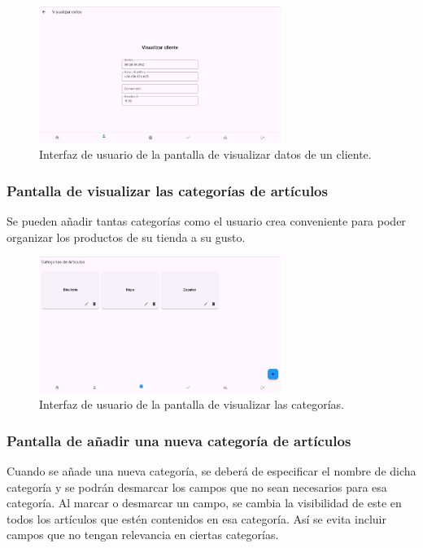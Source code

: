 \begin{figure}[H]
	\centering
	\includegraphics[width=0.7\textwidth]{imagenes/PrimeraIteracion/detallesCliente.png}
	\caption{Interfaz de usuario de la pantalla de visualizar datos de un cliente.}
	\label{fig:appDetallesCliente}
\end{figure}

\subsubsection{Pantalla de visualizar las categorías de artículos}

Se pueden añadir tantas categorías como el usuario crea conveniente para poder organizar los productos de su tienda a su gusto. 

\begin{figure}[H]
	\centering
	\includegraphics[width=0.7\textwidth]{imagenes/PrimeraIteracion/visualizarCategorias.png}
	\caption{Interfaz de usuario de la pantalla de visualizar las categorías.}
	\label{fig:appCategoriasArticulos}
\end{figure}

\subsubsection{Pantalla de añadir una nueva categoría de artículos}

Cuando se añade una nueva categoría, se deberá de especificar el nombre de dicha categoría y se podrán desmarcar los campos que no sean necesarios para esa categoría. Al marcar o desmarcar un campo, se cambia la visibilidad de este en todos los artículos que estén contenidos en esa categoría. Así se evita incluir campos que no tengan relevancia en ciertas categorías. 


